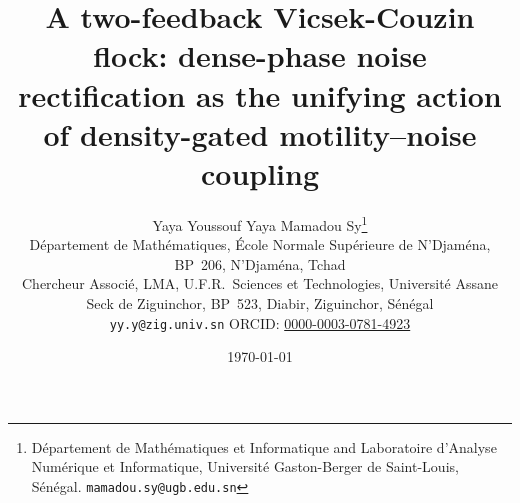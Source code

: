 \documentclass[11pt,a4paper]{article}
\begin{document}
\title{A two-feedback Vicsek-Couzin flock: dense-phase noise rectification as the unifying action of density-gated motility--noise coupling}

\author{Yaya Youssouf Yaya \quad Mamadou Sy\thanks{D\'epartement de
        Math\'ematiques et Informatique and Laboratoire d'Analyse
        Num\'erique et Informatique, Universit\'e Gaston-Berger de
        Saint-Louis, S\'en\'egal. \texttt{mamadou.sy@ugb.edu.sn}} \\[0.5em]
        \small D\'epartement de Math\'ematiques, \'Ecole Normale Sup\'erieure de
               N'Djam\'ena, BP~206, N'Djam\'ena, Tchad \\
        \small Chercheur Associ\'e, LMA, U.F.R.~Sciences et Technologies,
               Universit\'e Assane Seck de Ziguinchor, BP~523, Diabir,
               Ziguinchor, S\'en\'egal \\
        \small \texttt{yy.y@zig.univ.sn} \;\;
               ORCID: \href{https://orcid.org/0000-0003-0781-4923}{0000-0003-0781-4923}}

\date{\today}

\maketitle
\end{document}
